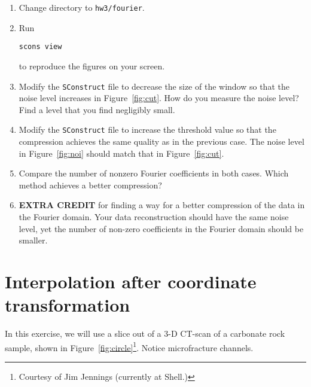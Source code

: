 

\begin{enumerate}
\item Change directory to \texttt{hw3/fourier}.
\item Run 
\begin{verbatim}
scons view
\end{verbatim}
to reproduce the figures on your screen.
\item Modify the \texttt{SConstruct} file to decrease the size of the window so that the noise level increases in Figure~\ref{fig:cut}. How do you measure the noise level? Find a level that you find negligibly small.
\item Modify the \texttt{SConstruct} file to increase the threshold value so that the compression achieves the same quality as in the previous case. The noise level in Figure~\ref{fig:noi} should match that in Figure~\ref{fig:cut}.
\item Compare the number of nonzero Fourier coefficients in both cases. Which method achieves a better compression?
\item \textbf{EXTRA CREDIT} for finding a way for a better compression of the data in the Fourier domain. Your data reconstruction should have 
the same noise level, yet the number of non-zero coefficients in the Fourier domain should be smaller.
\end{enumerate}

\lstset{language=python,numbers=left,numberstyle=\tiny,showstringspaces=false}


\section{Interpolation after coordinate transformation}

In this exercise, we will use a slice out of a 3-D CT-scan of a
carbonate rock sample, shown in
Figure~\ref{fig:circle}\footnote{Courtesy of Jim Jennings
  (currently at Shell.)}. Notice microfracture channels.

